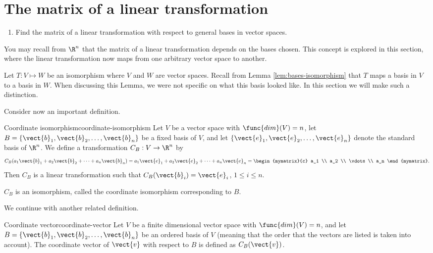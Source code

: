 \section{The matrix of a linear transformation}

\begin{outcome}
  \begin{enumerate}
  \item Find the matrix of a linear transformation with respect to
    general bases in vector spaces.
  \end{enumerate}
\end{outcome}

You may recall from $\R^n$ that the matrix of a linear transformation depends on the bases chosen. This concept is explored in this section, where the linear transformation now maps from one arbitrary vector space to another. 

Let $T: V \mapsto W$ be an isomorphism where $V$ and $W$ are vector spaces. Recall from Lemma \ref{lem:bases-isomorphism} that $T$ maps a basis in $V$ to a basis in $W$. When discussing this Lemma, we were not specific on what this basis looked like. In this section we will make such a distinction. 

Consider now an important definition.

\begin{definition}{Coordinate isomorphism}{coordinate-isomorphism}
Let $V$ be a vector space with $\func{dim}(V)=n$, let $B=\{\vect{b}_1, \vect{b}_2, \ldots, \vect{b}_n\}$ be a fixed basis of $V$,
and let $\{\vect{e}_1, \vect{e}_2, \ldots, \vect{e}_n\}$
denote the standard basis of $\R^n$.
We define a transformation $C_B:V\to\R^n$ by
\[
C_B(a_1\vect{b}_1 + a_2\vect{b}_2 + \cdots + a_n\vect{b}_n)
=
a_1\vect{e}_1 + a_2\vect{e}_2 + \cdots + a_n\vect{e}_n
=
\begin{mymatrix}{c} a_1 \\ a_2 \\ \vdots \\ a_n
\end{mymatrix}.\]
Then $C_B$ is a linear transformation
such that
$C_B(\vect{b}_i)=\vect{e}_i$, $1\leq i\leq n$.

$C_B$ is an isomorphism, called
the coordinate isomorphism corresponding to $B$.
\end{definition}

We continue with another related definition.

\begin{definition}{Coordinate vector}{coordinate-vector}
Let $V$ be a finite dimensional vector space with $\func{dim}(V)=n$, and
let $B=\{\vect{b}_1, \vect{b}_2, \ldots, \vect{b}_n\}$ be an ordered basis of $V$ (meaning that the order that the
vectors are listed is taken into account).
The coordinate vector of $\vect{v}$ with respect to $B$ is defined
as $C_B(\vect{v})$.
\end{definition}

